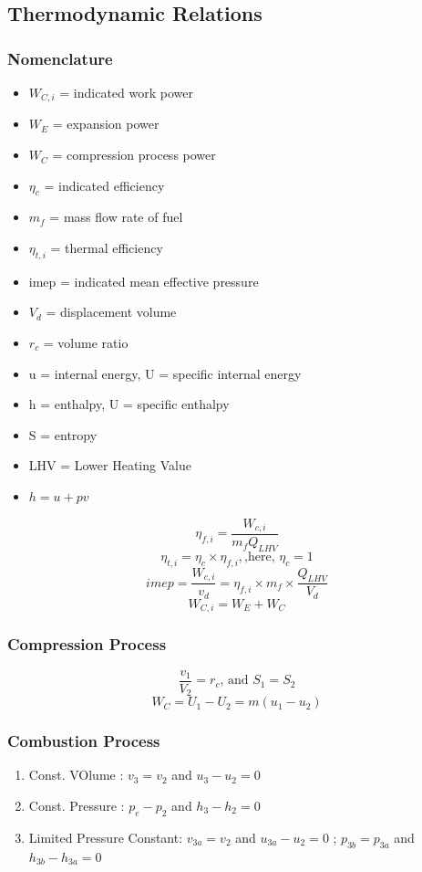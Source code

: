 \documentclass{article}
\begin{document}
  \subsection*{Thermodynamic Relations}
  \begin{multicols}{2}
	\subsubsection*{Nomenclature}
	\begin{itemize}
		\item $W_{C,i}$ = indicated work power
		\item $W_{E}$ = expansion power
		\item $W_{C}$ = compression process power
		\item $\eta_c$ = indicated efficiency 
		\item $m_f$ = mass flow rate of fuel 
		\item $\eta_{t,i}$ = thermal efficiency 
		\item imep = indicated mean effective pressure 
		\item $V_d$ = displacement volume 
		\item $r_c$ = volume ratio 
		\item u = internal energy, U = specific internal energy 
		\item h = enthalpy, U = specific enthalpy 
		\item S = entropy 
		\item LHV = Lower Heating Value
		\item $h = u + pv $
	\end{itemize}
	$$\eta_{f,i} = \frac{W_{c,i}}{m_f Q_{LHV}}$$
	$$\eta_{t,i} = \eta_c \times \eta_{f,i}, \text{,here, } \eta_c=1 $$
	$$imep = \frac{W_{c,i}}{v_d} = \eta_{f,i} \times m_f \times \frac{Q_{LHV}}{V_d}$$
	$$W_{C,i} = W_E + W_C$$
	\subsubsection*{Compression Process}
	$$\frac{v_1}{V_2} = r_c \text{, and } S_1 = S_2$$
	$$W_C = U_1-U_2 = m(u_1-u_2)$$
	
	\subsubsection*{Combustion Process}
	\begin{enumerate}
		\item Const. VOlume : $v_3 = v_2$ and $u_3 - u_2 = 0$
		\item Const. Pressure : $p_e - p_2$ and $h_3 - h_2 = 0$
		\item Limited Pressure Constant: $v_{3a} = v_2$ and $u_{3a}-u_2 = 0$ ; $p_{3b}=p_{3a}$ and $h_{3b} - h_{3a} = 0$
	\end{enumerate}

\end{multicols}
\end{document}
